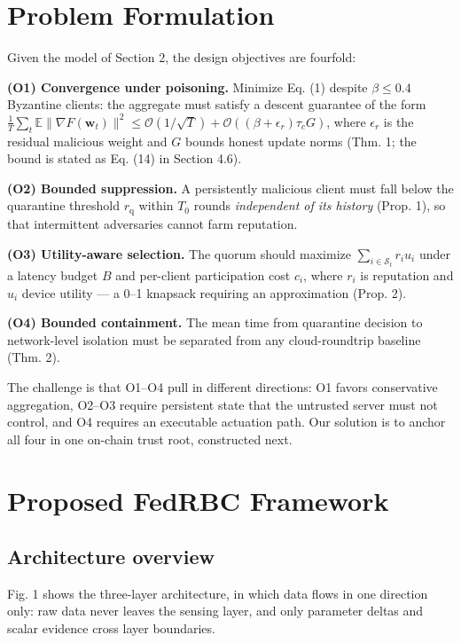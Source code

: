 \documentclass[cmc,article,submit,moreauthors,pdftex]{Definitions/tsp}
\begin{document}
\section{Problem Formulation}\label{sec:problem-formulation}

Given the model of Section 2, the design objectives are fourfold:

\textbf{(O1) Convergence under poisoning.} Minimize Eq. (1) despite $\beta \le 0.4$ Byzantine clients: the aggregate must satisfy a descent guarantee of the form $\frac{1}{T}\sum_t \mathbb{E}\|\nabla F(\mathbf{w}_t)\|^2 \le \mathcal{O}(1/\sqrt{T}) + \mathcal{O}((\beta + \epsilon_r)\tau_c G)$, where $\epsilon_r$ is the residual malicious weight and $G$ bounds honest update norms (Thm. 1; the bound is stated as Eq. (14) in Section 4.6).

\textbf{(O2) Bounded suppression.} A persistently malicious client must fall below the quarantine threshold $r_{\mathrm{q}}$ within $T_0$ rounds \emph{independent of its history} (Prop. 1), so that intermittent adversaries cannot farm reputation.

\textbf{(O3) Utility-aware selection.} The quorum should maximize $\sum_{i\in\mathcal{S}_t} r_i u_i$ under a latency budget $B$ and per-client participation cost $c_i$, where $r_i$ is reputation and $u_i$ device utility --- a 0--1 knapsack requiring an approximation (Prop. 2).

\textbf{(O4) Bounded containment.} The mean time from quarantine decision to network-level isolation must be separated from any cloud-roundtrip baseline (Thm. 2).

The challenge is that O1--O4 pull in different directions: O1 favors conservative aggregation, O2--O3 require persistent state that the untrusted server must not control, and O4 requires an executable actuation path. Our solution is to anchor all four in one on-chain trust root, constructed next.

\section{Proposed FedRBC Framework}\label{sec:proposed-fedrbc-framework}

\subsection{Architecture overview}\label{sec:architecture-overview}

Fig. 1 shows the three-layer architecture, in which data flows in one direction only: raw data never leaves the sensing layer, and only parameter deltas and scalar evidence cross layer boundaries.
\end{document}
